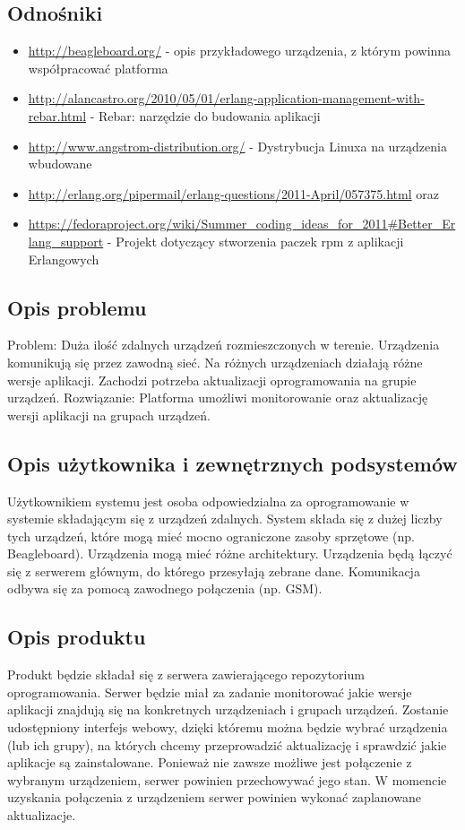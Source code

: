 \documentclass[polish,12pt]{aghthesis}
\begin{document}
\subsection{Odnośniki}
\begin{itemize}
\item \url{http://beagleboard.org/} - opis przykładowego urządzenia, z którym powinna współpracować platforma
\item \url{http://alancastro.org/2010/05/01/erlang-application-management-with-rebar.html} - Rebar: narzędzie do budowania aplikacji
\item \url{http://www.angstrom-distribution.org/} - Dystrybucja Linuxa na urządzenia wbudowane
\item \url{http://erlang.org/pipermail/erlang-questions/2011-April/057375.html} oraz
\item \url{https://fedoraproject.org/wiki/Summer_coding_ideas_for_2011#Better_Erlang_support} - Projekt dotyczący stworzenia paczek rpm z aplikacji Erlangowych
\end{itemize}

\subsection{Opis problemu}
Problem: Duża ilość zdalnych urządzeń rozmieszczonych w terenie. Urządzenia komunikują się przez zawodną sieć. Na różnych urządzeniach działają różne wersje aplikacji. Zachodzi potrzeba aktualizacji oprogramowania na grupie urządzeń. Rozwiązanie: Platforma umożliwi monitorowanie oraz aktualizację wersji aplikacji na grupach urządzeń.

\subsection{Opis użytkownika i zewnętrznych podsystemów}
Użytkownikiem systemu jest osoba odpowiedzialna za oprogramowanie w systemie składającym się z urządzeń zdalnych. System składa się z dużej liczby tych urządzeń, które mogą mieć mocno ograniczone zasoby sprzętowe (np. Beagleboard). Urządzenia mogą mieć różne architektury. Urządzenia będą łączyć się z serwerem głównym, do którego przesyłają zebrane dane. Komunikacja odbywa się za pomocą zawodnego połączenia (np. GSM).

\subsection{Opis produktu}
Produkt będzie składał się z serwera zawierającego repozytorium oprogramowania. Serwer będzie miał za zadanie monitorować jakie wersje aplikacji znajdują się na konkretnych urządzeniach i grupach urządzeń. Zostanie udostępniony interfejs webowy, dzięki któremu można będzie wybrać urządzenia (lub ich grupy), na których chcemy przeprowadzić aktualizację i sprawdzić jakie aplikacje są zainstalowane. Ponieważ nie zawsze możliwe jest połączenie z wybranym urządzeniem, serwer powinien przechowywać jego stan. W momencie uzyskania połączenia z urządzeniem serwer powinien wykonać zaplanowane aktualizacje.
\end{document}
